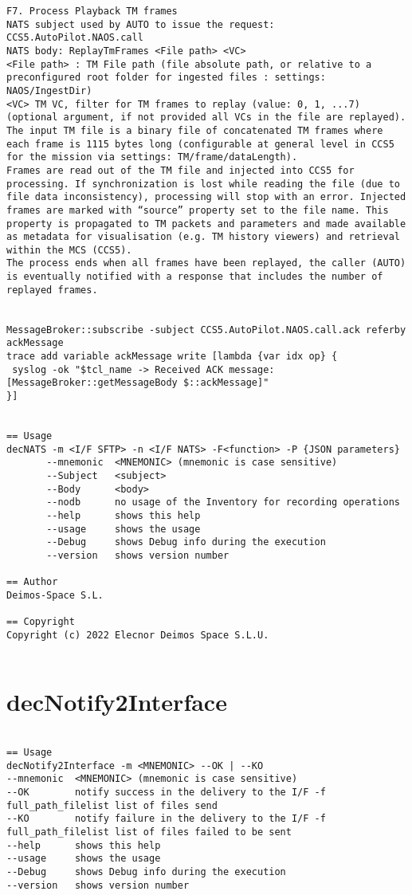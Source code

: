 \documentclass[dec_sum_main.tex]{subfiles}
\begin{document}
\begin{verbatim}
F7. Process Playback TM frames
NATS subject used by AUTO to issue the request: CCS5.AutoPilot.NAOS.call
NATS body: ReplayTmFrames <File path> <VC>
<File path> : TM File path (file absolute path, or relative to a preconfigured root folder for ingested files : settings: NAOS/IngestDir)
<VC> TM VC, filter for TM frames to replay (value: 0, 1, ...7) (optional argument, if not provided all VCs in the file are replayed).
The input TM file is a binary file of concatenated TM frames where each frame is 1115 bytes long (configurable at general level in CCS5 for the mission via settings: TM/frame/dataLength).
Frames are read out of the TM file and injected into CCS5 for processing. If synchronization is lost while reading the file (due to file data inconsistency), processing will stop with an error. Injected frames are marked with “source” property set to the file name. This property is propagated to TM packets and parameters and made available as metadata for visualisation (e.g. TM history viewers) and retrieval within the MCS (CCS5).
The process ends when all frames have been replayed, the caller (AUTO) is eventually notified with a response that includes the number of replayed frames.


MessageBroker::subscribe -subject CCS5.AutoPilot.NAOS.call.ack referby ackMessage
trace add variable ackMessage write [lambda {var idx op} {
 syslog -ok "$tcl_name -> Received ACK message: [MessageBroker::getMessageBody $::ackMessage]"
}]


== Usage
decNATS -m <I/F SFTP> -n <I/F NATS> -F<function> -P {JSON parameters}
       --mnemonic  <MNEMONIC> (mnemonic is case sensitive)
       --Subject   <subject>
       --Body      <body>
       --nodb      no usage of the Inventory for recording operations
       --help      shows this help
       --usage     shows the usage
       --Debug     shows Debug info during the execution
       --version   shows version number

== Author
Deimos-Space S.L.

== Copyright
Copyright (c) 2022 Elecnor Deimos Space S.L.U.


\end{verbatim}

\label{decNotify2Interface}
\section{decNotify2Interface}

\begin{verbatim}

== Usage
decNotify2Interface -m <MNEMONIC> --OK | --KO
--mnemonic  <MNEMONIC> (mnemonic is case sensitive)
--OK        notify success in the delivery to the I/F -f full_path_filelist list of files send
--KO        notify failure in the delivery to the I/F -f full_path_filelist list of files failed to be sent
--help      shows this help
--usage     shows the usage
--Debug     shows Debug info during the execution
--version   shows version number

\end{verbatim}
\end{document}
